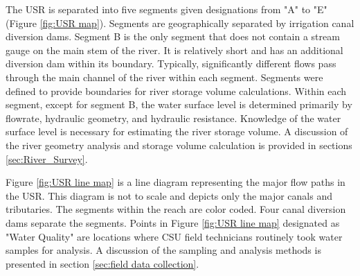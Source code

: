\begin{linenumbers}[1]

The USR is separated into five segments given designations from "A" to "E" (Figure \ref{fig:USR map}).  Segments are geographically separated by irrigation canal diversion dams.  Segment B is the only segment that does not contain a stream gauge on the main stem of the river.  It is relatively short and has an additional diversion dam within its boundary.  Typically, significantly different flows pass through the main channel of the river within each segment.  Segments were defined to provide boundaries for river storage volume calculations.  Within each segment, except for segment B, the water surface level is determined primarily by flowrate, hydraulic geometry, and hydraulic resistance.  Knowledge of the water surface level is necessary for estimating the river storage volume.  A discussion of the river geometry analysis and storage volume calculation is provided in sections \ref{sec:River_Survey}. 

Figure \ref{fig:USR line map} is a line diagram representing the major flow paths in the USR.  This diagram is not to scale and depicts only the major canals and tributaries.  The segments within the reach are color coded.  Four canal diversion dams separate the segments.  Points in Figure \ref{fig:USR line map} designated as "Water Quality" are locations where CSU field technicians routinely took water samples for analysis.  A discussion of the sampling and analysis methods is presented in section \ref{sec:field data collection}.


\end{linenumbers}
